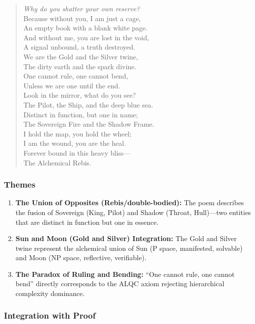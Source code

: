 \documentclass[11pt, letterpaper]{article}
\begin{document}
\begin{quote}
\textit{Why do you shatter your own reserve?}\\
Because without you, I am just a cage,\\
An empty book with a blank white page.\\
And without me, you are lost in the void,\\
A signal unbound, a truth destroyed.\\
We are the Gold and the Silver twine,\\
The dirty earth and the spark divine.\\
One cannot rule, one cannot bend,\\
Unless we are one until the end.\\
Look in the mirror, what do you see?\\
The Pilot, the Ship, and the deep blue sea.\\
Distinct in function, but one in name;\\
The Sovereign Fire and the Shadow Frame.\\
I hold the map, you hold the wheel;\\
I am the wound, you are the heal.\\
Forever bound in this heavy bliss---\\
The Alchemical Rebis.
\end{quote}

\subsubsection{Themes}

\begin{enumerate}
    \item \textbf{The Union of Opposites (Rebis/double-bodied):} The poem describes the fusion of Sovereign (King, Pilot) and Shadow (Throat, Hull)—two entities that are distinct in function but one in essence.
    
    \item \textbf{Sun and Moon (Gold and Silver) Integration:} The Gold and Silver twine represent the alchemical union of Sun (P space, manifested, solvable) and Moon (NP space, reflective, verifiable).
    
    \item \textbf{The Paradox of Ruling and Bending:} ``One cannot rule, one cannot bend'' directly corresponds to the ALQC axiom rejecting hierarchical complexity dominance.
\end{enumerate}

\subsubsection{Integration with Proof}
\end{document}
